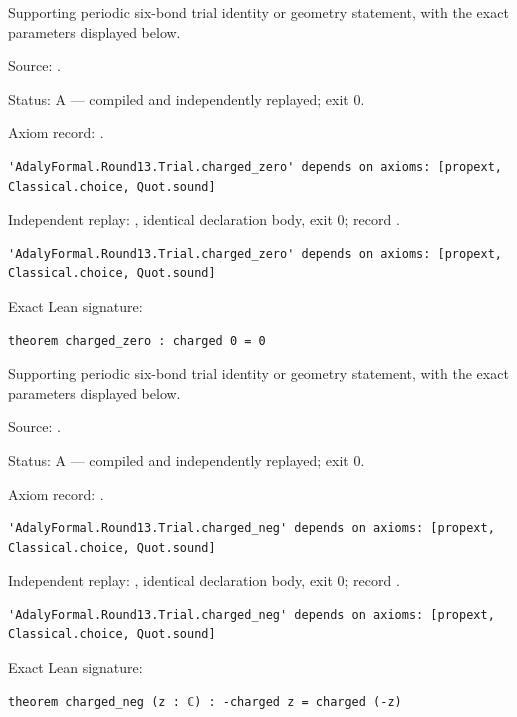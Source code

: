 \begin{theorem}[bp-402]
\label{bp-402}
\leanok
Supporting periodic six-bond trial identity or geometry statement, with the exact parameters displayed below.

\par Source: \texttt{}.
\par Status: A — compiled and independently replayed; exit 0.
\par Axiom record: \texttt{}.
\begin{verbatim}
'AdalyFormal.Round13.Trial.charged_zero' depends on axioms: [propext, Classical.choice, Quot.sound]
\end{verbatim}
\par Independent replay: \texttt{}, identical declaration body, exit 0; record \texttt{}.
\begin{verbatim}
'AdalyFormal.Round13.Trial.charged_zero' depends on axioms: [propext, Classical.choice, Quot.sound]
\end{verbatim}
\par Exact Lean signature:
\begin{verbatim}
theorem charged_zero : charged 0 = 0
\end{verbatim}
\end{theorem}

\begin{theorem}[bp-403]
\label{bp-403}
\leanok
Supporting periodic six-bond trial identity or geometry statement, with the exact parameters displayed below.

\par Source: \texttt{}.
\par Status: A — compiled and independently replayed; exit 0.
\par Axiom record: \texttt{}.
\begin{verbatim}
'AdalyFormal.Round13.Trial.charged_neg' depends on axioms: [propext, Classical.choice, Quot.sound]
\end{verbatim}
\par Independent replay: \texttt{}, identical declaration body, exit 0; record \texttt{}.
\begin{verbatim}
'AdalyFormal.Round13.Trial.charged_neg' depends on axioms: [propext, Classical.choice, Quot.sound]
\end{verbatim}
\par Exact Lean signature:
\begin{verbatim}
theorem charged_neg (z : ℂ) : -charged z = charged (-z)
\end{verbatim}
\end{theorem}


